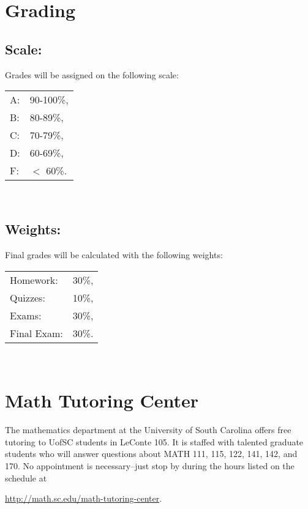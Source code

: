 \documentclass[10pt]{amsart}
\begin{document}
\newpage

\section*{Grading}
\subsection*{Scale:}
Grades will be assigned on the following scale:
\begin{center}
  \begin{tabular}{ll}
    A: &90-100\%,\\
    B: & 80-89\%,\\
    C: & 70-79\%,\\
    D: & 60-69\%,\\
    F: & $<$ 60\%.\\
  \end{tabular}\\
\end{center}
\subsection*{Weights:}
Final grades will be calculated with the following weights:
\begin{center}
  \begin{tabular}{lr}
    Homework: & 30\%,\\
    Quizzes: &10\%,\\
    Exams: & 30\%,\\
    Final Exam: & 30\%.\\
  \end{tabular}\\
\end{center}

\section*{Math Tutoring Center}
\noindent
The mathematics department at the University of South Carolina offers free tutoring to UofSC students in LeConte 105.
It is staffed with talented graduate students who will answer questions about MATH 111, 115, 122, 141, 142, and 170.
No appointment is necessary--just stop by during the hours listed on the schedule at
\begin{center}
  \url{http://math.sc.edu/math-tutoring-center}.
\end{center}
\end{document}
